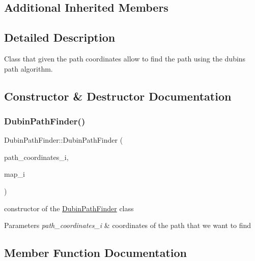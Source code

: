 \subsection*{Additional Inherited Members}


\subsection{Detailed Description}
Class that given the path coordinates allow to find the path using the dubins path algorithm. 

\subsection{Constructor \& Destructor Documentation}
\mbox{\label{class_dubin_path_finder_a111ab0ee03f0c67270987f5fdb474aec}} 
\subsubsection{\texorpdfstring{Dubin\+Path\+Finder()}{DubinPathFinder()}}
{\footnotesize\ttfamily Dubin\+Path\+Finder\+::\+Dubin\+Path\+Finder (\begin{DoxyParamCaption}\item[{\mbox{\hyperlink{class_path_coordinates}{Path\+Coordinates}}}]{path\+\_\+coordinates\+\_\+i,  }\item[{\mbox{\hyperlink{class_map}{Map}} $\ast$}]{map\+\_\+i }\end{DoxyParamCaption})}



constructor of the \mbox{\hyperlink{class_dubin_path_finder}{Dubin\+Path\+Finder}} class 


\begin{DoxyParams}{Parameters}
{\em path\+\_\+coordinates\+\_\+i} & coordinates of the path that we want to find \\
\hline
\end{DoxyParams}


\subsection{Member Function Documentation}
\mbox{\label{class_dubin_path_finder_acec45029cf276492787699e4d04d2779}} 
